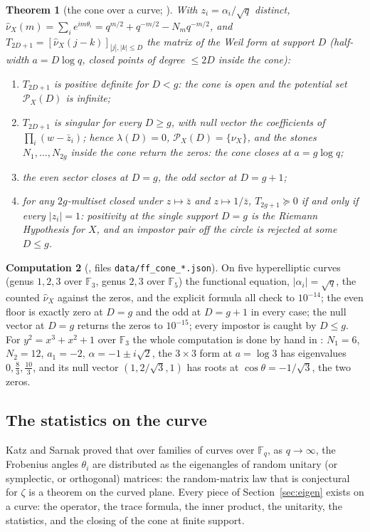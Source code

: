 \documentclass[11pt]{article}
\newtheorem{theorem}{Theorem}[section]
\theoremstyle{definition}
\newtheorem{computation}[theorem]{Computation}
\theoremstyle{remark}
\newcommand{\F}{\mathbb F}
\newcommand{\PS}{\mathcal P}
\begin{document}
\begin{theorem}[the cone over a curve; {\cite[\S2]{ffcone}}]\label{thm:ffcone}
With $z_i=\alpha_i/\sqrt q$ distinct, $\hat\nu_X(m)=\sum_ie^{im\theta_i}=q^{m/2}+q^{-m/2}-N_mq^{-m/2}$, and $T_{2D+1}=[\hat\nu_X(j-k)]_{|j|,|k|\le D}$ the matrix of the Weil form at support $D$ (half-width $a=D\log q$, closed points of degree $\le2D$ inside the cone):
\begin{enumerate}
\item[(i)] $T_{2D+1}$ is positive definite for $D<g$: the cone is open and the potential set $\PS_X(D)$ is infinite;
\item[(ii)] $T_{2D+1}$ is singular for every $D\ge g$, with null vector the coefficients of $\prod_i(w-\bar z_i)$; hence $\lambda(D)=0$, $\PS_X(D)=\{\nu_X\}$, and the stones $N_1,\dots,N_{2g}$ inside the cone return the zeros: the cone closes at $a=g\log q$;
\item[(iii)] the even sector closes at $D=g$, the odd sector at $D=g+1$;
\item[(iv)] for any $2g$-multiset closed under $z\mapsto\bar z$ and $z\mapsto1/\bar z$, $T_{2g+1}\succeq0$ if and only if every $|z_i|=1$: positivity at the single support $D=g$ is the Riemann Hypothesis for $X$, and an impostor pair off the circle is rejected at some $D\le g$.
\end{enumerate}
\end{theorem}
\begin{computation}[{\cite[\S3]{ffcone}}, files \texttt{data/ff\_cone\_*.json}]
On five hyperelliptic curves (genus $1,2,3$ over $\F_3$, genus $2,3$ over $\F_5$) the functional equation, $|\alpha_i|=\sqrt q$, the counted $\hat\nu_X$ against the zeros, and the explicit formula all check to $10^{-14}$; the even floor is exactly zero at $D=g$ and the odd at $D=g+1$ in every case; the null vector at $D=g$ returns the zeros to $10^{-15}$; every impostor is caught by $D\le g$. For $y^2=x^3+x^2+1$ over $\F_3$ the whole computation is done by hand in \cite{reading}: $N_1=6$, $N_2=12$, $a_1=-2$, $\alpha=-1\pm i\sqrt2$, the $3\times3$ form at $a=\log3$ has eigenvalues $0,\tfrac83,\tfrac{10}3$, and its null vector $(1,2/\sqrt3,1)$ has roots at $\cos\theta=-1/\sqrt3$, the two zeros.
\end{computation}

\subsection{The statistics on the curve}
Katz and Sarnak \cite{katzsarnak} proved that over families of curves over $\F_q$, as $q\to\infty$, the Frobenius angles $\theta_i$ are distributed as the eigenangles of random unitary (or symplectic, or orthogonal) matrices: the random-matrix law that is conjectural for $\zeta$ is a theorem on the curved plane. Every piece of Section~\ref{sec:eigen} exists on a curve: the operator, the trace formula, the inner product, the unitarity, the statistics, and the closing of the cone at finite support.
\end{document}
